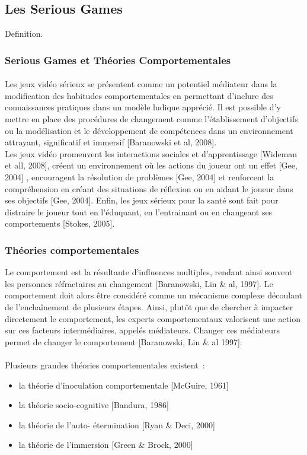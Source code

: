 \subsection{Les Serious Games}
Definition.
	\subsubsection{Serious Games et Théories Comportementales }
			\paragraph{}
Les jeux vidéo sérieux se présentent comme un potentiel médiateur dans la modification des habitudes comportementales en permettant d’inclure des connaissances pratiques dans un modèle ludique apprécié. Il est possible d’y mettre en place des procédures de changement comme l’établissement d’objectifs ou la modélisation et le développement de compétences dans un environnement attrayant, significatif et immersif [Baranowski et al, 2008]. \\
Les jeux vidéo promeuvent les interactions sociales et d’apprentissage [Wideman et all, 2008], créent un environnement où les actions du joueur ont un effet [Gee, 2004] , encouragent la résolution de problèmes [Gee, 2004] et renforcent la compréhension en créant des situations de réflexion ou en aidant le joueur dans ses objectifs [Gee, 2004]. Enfin, les jeux sérieux pour la santé sont fait pour distraire le joueur tout en l’éduquant, en l’entrainant ou en changeant ses comportements [Stokes, 2005].

		\subsubsection*{Théories comportementales}
Le comportement est la résultante d’influences multiples, rendant ainsi souvent les personnes réfractaires au changement [Baranowski, Lin \& al, 1997]. Le comportement doit alors être considéré comme un mécanisme complexe découlant de l’enchaînement de plusieurs étapes. Ainsi, plutôt que de chercher à impacter directement le comportement, les experts comportementaux valorisent une action sur ces facteurs intermédiaires, appelés médiateurs. Changer ces médiateurs permet de changer le comportement [Baranowski, Lin \& al 1997].
\paragraph{}Plusieurs grandes théories comportementales existent~:
\begin{itemize}
	\item la théorie d’inoculation comportementale [McGuire, 1961]
	\item la théorie socio-cognitive [Bandura, 1986]
	\item la théorie de l’auto- étermination [Ryan \& Deci, 2000]
	\item la théorie de l’immersion [Green \& Brock, 2000]
\end{itemize}

